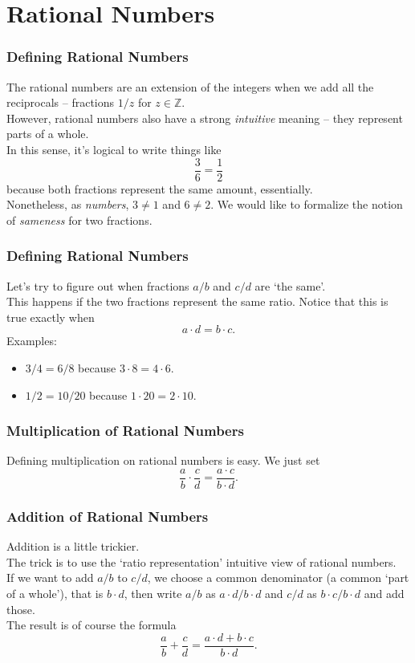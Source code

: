 \documentclass[aspectratio=169,11pt,usenames,dvipsnames]{beamer}
\newcommand{\Z}{\mathbb{Z}}
\begin{document}
\section{Rational Numbers}
\label{sec:rational-numbers}

\begin{frame}
 \frametitle{Def\hspace*{0pt}ining Rational Numbers}
 The rational numbers are an extension of the integers when we add all the
 \alert{reciprocals} -- fractions $1 / z$ for $z \in \Z$.\pause\\
 However, rational numbers also have a strong \emph{intuitive} meaning -- they
 represent \alert{parts of a whole}.\pause\\
 In this sense, it's logical to write things like
 \[
  \frac{3}{6} = \frac{1}{2}
 \]
 because both fractions represent the same amount, essentially.\pause\\
 Nonetheless, as \emph{numbers}, $3 \neq 1$ and $6 \neq 2$. We would like to
 formalize the notion of \emph{sameness} for two fractions.
\end{frame}

\begin{frame}
 \frametitle{Def\hspace*{0pt}ining Rational Numbers}
 Let's try to figure out when fractions $a / b$ and $c / d$ are `the
 same'.\pause\\
 This happens if the two fractions represent the same ratio. \pause
 Notice that this is true \alert{exactly when}
 \[
  a \cdot d = b \cdot c.
 \]
 \pause
 Examples:
 \begin{itemize}[label=\textbullet]
  \item $3 / 4 = 6 / 8$ because $3 \cdot 8 = 4 \cdot 6$.
  \pause
  \item $1 / 2 = 10 / 20$ because $1 \cdot 20 = 2 \cdot 10$.
 \end{itemize}
\end{frame}

\begin{frame}
 \frametitle{Multiplication of Rational Numbers}
 Defining multiplication on rational numbers is easy. \pause
 We just set
 \[
  \frac{a}{b} \cdot \frac{c}{d} = \frac{a \cdot c}{b \cdot d}.
 \]
\end{frame}

\begin{frame}
 \frametitle{Addition of Rational Numbers}
 Addition is a little trickier.\pause\\
 The trick is to use the `ratio representation' intuitive view of rational
 numbers.\pause\\
 If we want to add $a / b$ to $c / d$, we choose a common denominator (a common
 `part of a whole'), that is $b \cdot d$, then write $a / b$ as $a \cdot d /
 b \cdot d$ and $c / d$ as $b \cdot c / b \cdot d$ and add those.\pause\\
 The result is of course the formula
 \[
  \frac{a}{b} + \frac{c}{d} = \frac{a \cdot d + b \cdot c}{b \cdot d}.
 \]
 
\end{frame}
\end{document}
